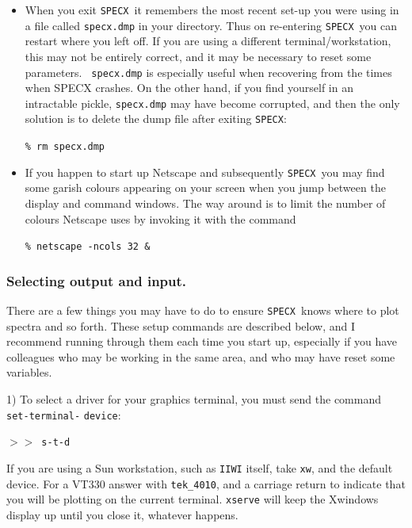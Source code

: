 \documentclass[11pt,twoside]{article}
\newcommand{\SPECX}{{\tt SPECX}}
\newcommand{\SP}{{$>\!>$}}
\begin{document}
\begin{itemize}
\SP\ \verb|$ ls -l *_map.sdf|

Or I could start up {\tt emacs} in a separate window with the aim of
making command files:

\SP\ \verb|$ emacs &|

The {\tt \$} sign is an echo of the VMS origins of \SPECX .
\item
When you exit \SPECX\ it remembers the most recent set-up you were
using in a file called {\tt specx.dmp} in your directory. Thus on
re-entering \SPECX\ you can restart where you left off. If you are
using a different terminal/workstation, this may not be entirely
correct, and it may be necessary to reset some parameters. {\tt
specx.dmp} is especially useful when recovering from the times when
SPECX crashes. On the other hand, if you find yourself in an
intractable pickle, {\tt specx.dmp} may have become corrupted, and
then the only solution is to delete the dump file after exiting 
\SPECX:

\verb|% rm specx.dmp|

\item
If you happen to start up {\sc Netscape} and subsequently \SPECX\ you
may find some garish colours appearing on your screen when you jump
between the display and command windows. The way around is to limit
the number of colours {\sc Netscape} uses by invoking it with the
command

\verb|% netscape -ncols 32 &|

\end{itemize}

\subsubsection{Selecting output and input.}
\label{sec:preparing-specx}
There are a few things you may have to do to ensure \SPECX\ knows where to
plot spectra and so forth. These setup commands are described below,
and I recommend running through them each time you start up,
especially if you have colleagues who may be working in the same area,
and who may have reset some variables.

1) To select a driver for your graphics terminal, you must send the command 
{\tt set-terminal-} {\tt device}:

\SP\  {\tt s-t-d} 

If you are using a Sun workstation, such as {\tt IIWI} itself, take
{\tt xw}, and the default device. For a VT330 answer with
{\tt tek\_4010}, and a carriage return to indicate that you will be
plotting on the current terminal. {\tt xserve} will keep the Xwindows
display up until you close it, whatever happens.
\end{document}
